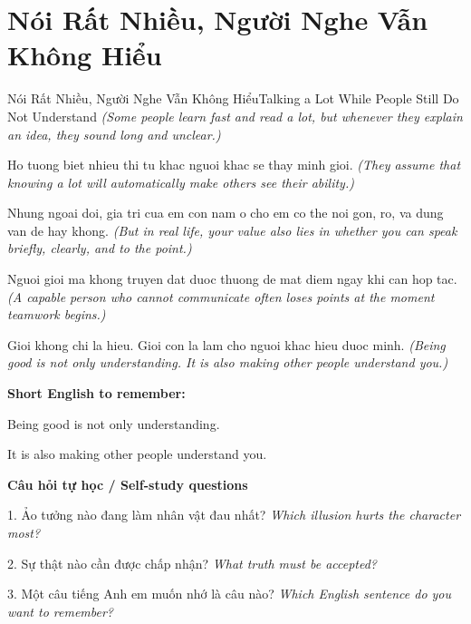 \section{Nói Rất Nhiều, Người Nghe Vẫn Không Hiểu}
\begin{truyen}{Nói Rất Nhiều, Người Nghe Vẫn Không Hiểu}{Talking a Lot While People Still Do Not Understand}
\textit{(Some people learn fast and read a lot, but whenever they explain an idea, they sound long and unclear.)}

Ho tuong biet nhieu thi tu khac nguoi khac se thay minh gioi.
\textit{(They assume that knowing a lot will automatically make others see their ability.)}

Nhung ngoai doi, gia tri cua em con nam o cho em co the noi gon, ro, va dung van de hay khong.
\textit{(But in real life, your value also lies in whether you can speak briefly, clearly, and to the point.)}

Nguoi gioi ma khong truyen dat duoc thuong de mat diem ngay khi can hop tac.
\textit{(A capable person who cannot communicate often loses points at the moment teamwork begins.)}

\end{truyen}

\begin{baihoc}
Gioi khong chi la hieu. Gioi con la lam cho nguoi khac hieu duoc minh.
\textit{(Being good is not only understanding. It is also making other people understand you.)}
\end{baihoc}

\begin{ghinhoanh}
\textbf{Short English to remember:}

Being good is not only understanding.

It is also making other people understand you.

\end{ghinhoanh}

\begin{tuhocnhanh}
\textbf{Câu hỏi tự học / Self-study questions}

1. Ảo tưởng nào đang làm nhân vật đau nhất? \textit{Which illusion hurts the character most?}

2. Sự thật nào cần được chấp nhận? \textit{What truth must be accepted?}

3. Một câu tiếng Anh em muốn nhớ là câu nào? \textit{Which English sentence do you want to remember?}
\end{tuhocnhanh}
\ngancach

